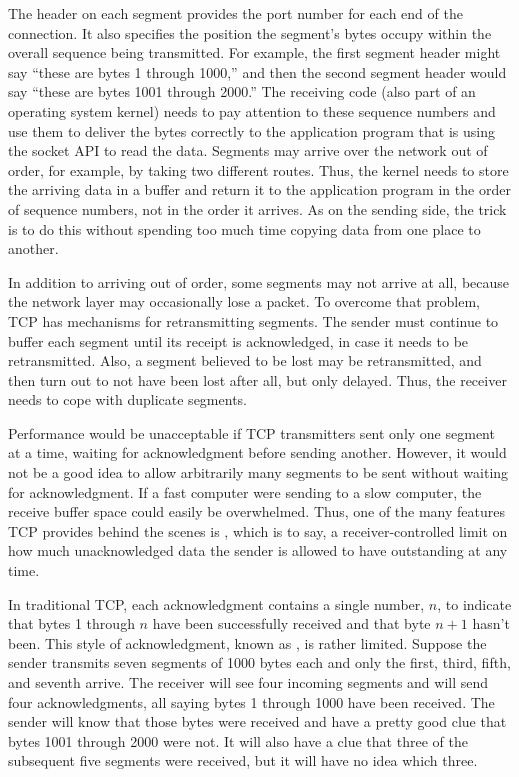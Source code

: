 The header on each segment provides the port
number for each end of the connection.  It also specifies the
position the segment's bytes occupy within the overall sequence being
transmitted.  For example, the first segment header might say ``these
are bytes 1 through 1000,'' and then the second segment header would say
``these are bytes 1001 through 2000.''  The receiving code (also part of
an operating system kernel) needs to pay attention to these sequence
numbers and use them to deliver the bytes correctly to the application
program that is using the socket API to read the data.  Segments may
arrive over the network out of order, for example, by taking two
different routes.  Thus, the kernel needs to
store the arriving data in a buffer and return it to the application
program in the order of sequence numbers, not in the order it
arrives.  As on the sending side, the trick is to do this without
spending too much time copying data from one place to another.

In addition to arriving out of order, some segments may not arrive at
all, because the network layer may occasionally lose a packet.  To
overcome that problem, TCP has mechanisms for retransmitting segments.
The sender must continue to buffer each segment until its receipt is
acknowledged, in case it needs to be retransmitted.  Also, a segment
believed to be lost may be retransmitted, and then turn out to not
have been lost after all, but only delayed.  Thus, the receiver needs
to cope with duplicate segments.

Performance would be unacceptable if TCP transmitters sent only one
segment at a time, waiting for acknowledgment before sending another.
However, it would not be a good idea to allow arbitrarily many
segments to be sent without waiting for acknowledgment.  If a fast
computer were sending to a slow computer, the receive buffer space
could easily be overwhelmed.  Thus, one of the many features TCP
provides behind the scenes is , which is to say,
a receiver-controlled limit on how much unacknowledged data the sender
is allowed to have outstanding at any time.

In traditional TCP, each acknowledgment contains a single number, $n$,
to indicate that bytes 1 through $n$ have been successfully received
and that byte $n+1$ hasn't been.  This style of acknowledgment, known
as , is rather limited.  Suppose the sender
transmits seven segments of 1000 bytes each and only the first,
third, fifth, and seventh arrive.  The receiver will see four incoming
segments and will send four acknowledgments, all saying bytes 1
through 1000 have been received. The sender will know that those bytes
were received and have a pretty good clue that bytes 1001 through 2000
were not.  It will also have a clue that three of the subsequent five
segments were received, but it will have no idea which three.


